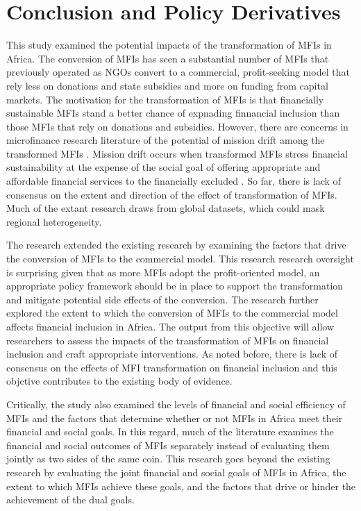 \documentclass[a4paper, nobind]{templates/ociamthesis}
\begin{document}
\hypertarget{conclusion-and-policy-derivatives}{%
\chapter{Conclusion and Policy Derivatives}\label{conclusion-and-policy-derivatives}}

This study examined the potential impacts of the transformation of MFIs in Africa. The conversion of MFIs has seen a substantial number of MFIs that previously operated as NGOs convert to a commercial, profit-seeking model that rely less on donations and state subsidies and more on funding from capital markets. The motivation for the transformation of MFIs is that financially sustainable MFIs stand a better chance of expnading finnancial inclusion than those MFIs that rely on donations and subsidies. However, there are concerns in microfinance research literature of the potential of mission drift among the transformed MFIs \autocite{armendariz2011mission,serrano2014microfinance}. Mission drift occurs when transformed MFIs stress financial sustainability at the expense of the social goal of offering appropriate and affordable financial services to the financially excluded \autocite{d2017ngos}. So far, there is lack of consensus on the extent and direction of the effect of transformation of MFIs. Much of the extant research draws from global datasets, which could mask regional heterogeneity.

The research extended the existing research by examining the factors that drive the conversion of MFIs to the commercial model. This research research oversight is surprising given that as more MFIs adopt the profit-oriented model, an appropriate policy framework should be in place to support the transformation and mitigate potential side effects of the conversion. The research further explored the extent to which the conversion of MFIs to the commercial model affects financial inclusion in Africa. The output from this objective will allow researchers to assess the impacts of the transformation of MFIs on financial inclusion and craft appropriate interventions. As noted before, there is lack of consensus on the effects of MFI transformation on financial inclusion and this objctive contributes to the existing body of evidence.

Critically, the study also examined the levels of financial and social efficiency of MFIs and the factors that determine whether or not MFIs in Africa meet their financial and social goals. In this regard, much of the literature examines the financial and social outcomes of MFIs separately instead of evaluating them jointly as two sides of the same coin. This research goes beyond the existing research by evaluating the joint financial and social goals of MFIs in Africa, the extent to which MFIs achieve these goals, and the factors that drive or hinder the achievement of the dual goals.
\end{document}
